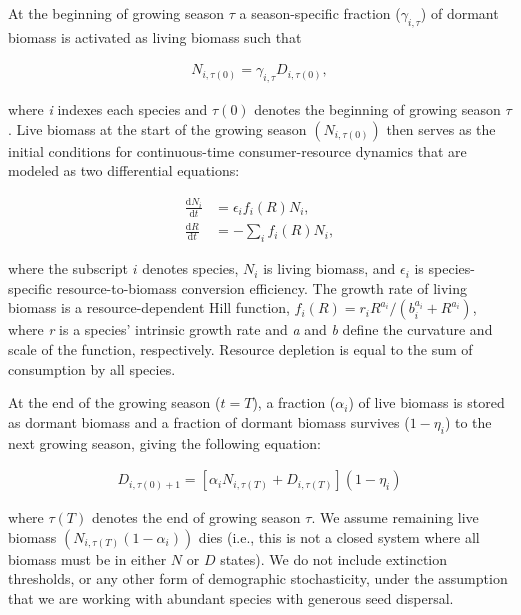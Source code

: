 \documentclass[12pt,]{article}
\begin{document}
At the beginning of growing season \(\tau\) a season-specific fraction
(\(\gamma_{i,\tau}\)) of dormant biomass is activated as living biomass
such that \vspace{-3em}

\begin{align}
N_{i,\tau(0)} = \gamma_{i,\tau} D_{i,\tau(0)},
\end{align}\vspace{-3em}

\noindent where \emph{i} indexes each species and \(\tau(0)\) denotes
the beginning of growing season \(\tau\). Live biomass at the start of
the growing season \(\left(N_{i,\tau(0)}\right)\) then serves as the
initial conditions for continuous-time consumer-resource dynamics that
are modeled as two differential equations: \vspace{-3em}

\begin{align}
\frac{\text{d}N_{i}}{\text{d}t} &= \epsilon_if_{i}(R)N_{i}, \\
\frac{\text{d}R}{\text{d}t} &= - \sum\limits_{i}f_{i}(R)N_{i},
\end{align}\vspace{-3em}

\noindent where the subscript \(i\) denotes species, \(N_i\) is living
biomass, and \(\epsilon_i\) is species-specific resource-to-biomass
conversion efficiency. The growth rate of living biomass is a
resource-dependent Hill function,
\(f_{i}(R) = r_{i}R^{a_{i}} / (b_{i}^{a_{i}}+R^{a_{i}})\), where
\emph{r} is a species' intrinsic growth rate and \emph{a} and \emph{b}
define the curvature and scale of the function, respectively. Resource
depletion is equal to the sum of consumption by all species.

At the end of the growing season (\(t=T\)), a fraction (\(\alpha_i\)) of
live biomass is stored as dormant biomass and a fraction of dormant
biomass survives (\(1-\eta_i\)) to the next growing season, giving the
following equation: \vspace{-3em}

\begin{align}
D_{i,\tau(0) + 1} = \left[\alpha_i N_{i,\tau(T)} + D_{i,\tau(T)} \right](1 - \eta_i)
\end{align}\vspace{-3em}

\noindent where \(\tau(T)\) denotes the end of growing season \(\tau\).
We assume remaining live biomass
\(\left(N_{i,\tau(T)}(1-\alpha_i)\right)\) dies (i.e., this is not a
closed system where all biomass must be in either \(N\) or \(D\)
states). We do not include extinction thresholds, or any other form of
demographic stochasticity, under the assumption that we are working with
abundant species with generous seed dispersal.
\end{document}
